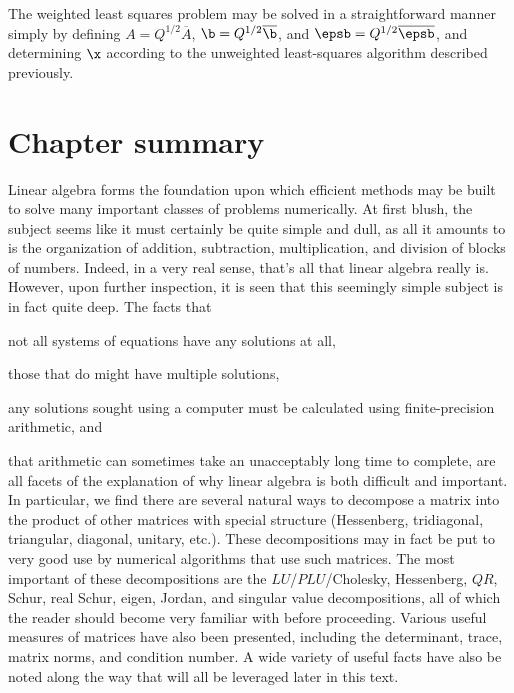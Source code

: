 The weighted least squares problem may be solved in a straightforward
manner simply by defining $A=Q^{1/2} \overline{A}$, $\b=Q^{1/2}
\overline{\b}$, and $\epsb=Q^{1/2} \overline{\epsb}$, and determining
$\x$ according to the unweighted least-squares algorithm
described previously.

%
%
%
%

\section{Chapter summary}

Linear algebra forms the foundation upon which efficient methods may
be built to solve many important classes of problems numerically.  
At first blush, the subject seems like it must certainly be quite simple and dull, as all it amounts to is
the organization of addition, subtraction, multiplication, and division of blocks
of numbers.  Indeed, in a very real sense, that's all that linear algebra really is.
However, upon further inspection, it is seen that this seemingly simple subject is in fact quite
deep.  The facts that
\beginmylistb
\item not all systems of equations have any solutions at all,
\item those that do might have multiple solutions,
\item any solutions sought using a computer must be calculated using finite-precision arithmetic, and
\item that arithmetic can sometimes take an unacceptably long time to complete,
\endmylist
\noindent are all facets of the explanation of why linear algebra is both difficult and important.  In particular,
we find there are several natural ways to decompose a matrix into the product of other matrices with
special structure (Hessenberg, tridiagonal, triangular, diagonal, unitary, etc.).  These decompositions
may in fact be put to very good use by numerical algorithms that use such matrices.  The most
important of these decompositions are the $LU$/$PLU$/Cholesky, Hessenberg, $QR$, Schur, real Schur, eigen,
Jordan, and singular value decompositions, all of which the reader should become very familiar with before proceeding.  
Various useful measures of matrices have also been presented, including the determinant, trace, matrix norms,
and condition number. A wide variety of useful facts have also be noted along the way that will all be leveraged later in this text.


